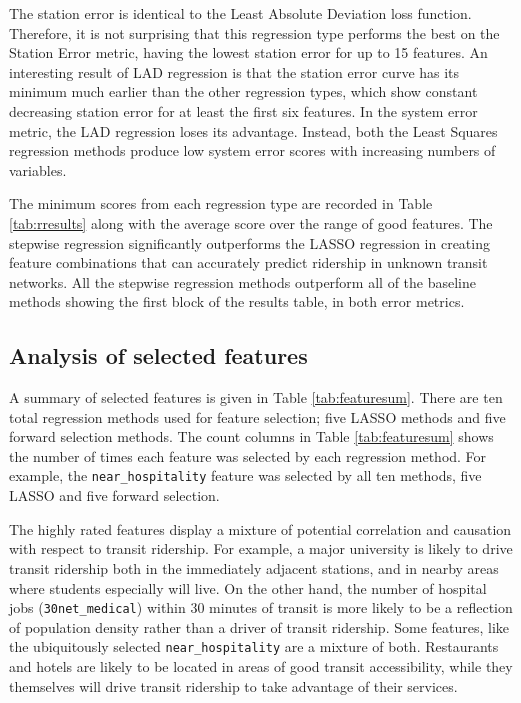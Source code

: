 \documentclass[11pt]{article}
\begin{document}
The station error is identical to the Least Absolute Deviation loss function. Therefore, it is not surprising that this regression type performs the best on the Station Error metric, having the lowest station error for up to 15 features. An interesting result of LAD regression is that the station error curve has its minimum much earlier than the other regression types, which show constant decreasing station error for at least the first six features. In the system error metric, the LAD regression loses its advantage. Instead, both the Least Squares regression methods produce low system error scores with increasing numbers of variables. 

The minimum scores from each regression type are recorded in Table \ref{tab:rresults} along with the average score over the range of good features. The stepwise regression significantly outperforms the LASSO regression in creating feature combinations that can accurately predict ridership in unknown transit networks. All the stepwise regression methods outperform all of the baseline methods showing the first block of the results table, in both error metrics. 

\subsection{Analysis of selected features}

A summary of selected features is given in Table \ref{tab:featuresum}. There are ten total regression methods used for feature selection; five LASSO methods and five forward selection methods. The count columns in Table \ref{tab:featuresum} shows the number of times each feature was selected by each regression method. For example, the \texttt{near\_hospitality} feature was selected by all ten methods, five LASSO and five forward selection.

The highly rated features display a mixture of potential correlation and causation with respect to transit ridership. For example, a major university is likely to drive transit ridership both in the immediately adjacent stations, and in nearby areas where students especially will live. On the other hand, the number of hospital jobs (\texttt{30net\_medical}) within 30 minutes of transit is more likely to be a reflection of population density rather than a driver of transit ridership. Some features, like the ubiquitously selected \texttt{near\_hospitality} are a mixture of both. Restaurants and hotels are likely to be located in areas of good transit accessibility, while they themselves will drive transit ridership to take advantage of their services. 
\end{document}
